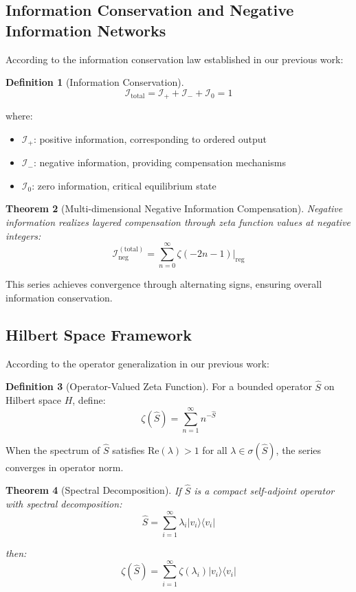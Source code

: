\documentclass[11pt]{article}
\theoremstyle{plain}
\newtheorem{theorem}{Theorem}[section]
\theoremstyle{definition}
\newtheorem{definition}[theorem]{Definition}
\theoremstyle{remark}
\begin{document}
\subsection{Information Conservation and Negative Information Networks}

According to the information conservation law established in our previous work:

\begin{definition}[Information Conservation]
$$\mathcal{I}_{\text{total}} = \mathcal{I}_+ + \mathcal{I}_- + \mathcal{I}_0 = 1$$
\end{definition}

where:
\begin{itemize}
\item $\mathcal{I}_+$: positive information, corresponding to ordered output
\item $\mathcal{I}_-$: negative information, providing compensation mechanisms
\item $\mathcal{I}_0$: zero information, critical equilibrium state
\end{itemize}

\begin{theorem}[Multi-dimensional Negative Information Compensation]
Negative information realizes layered compensation through zeta function values at negative integers:
$$\mathcal{I}_{\text{neg}}^{(\text{total})} = \sum_{n=0}^{\infty} \zeta(-2n-1) \bigg|_{\text{reg}}$$
\end{theorem}

This series achieves convergence through alternating signs, ensuring overall information conservation.

\subsection{Hilbert Space Framework}

According to the operator generalization in our previous work:

\begin{definition}[Operator-Valued Zeta Function]
For a bounded operator $\hat{S}$ on Hilbert space $H$, define:
$$\zeta(\hat{S}) = \sum_{n=1}^{\infty} n^{-\hat{S}}$$
\end{definition}

When the spectrum of $\hat{S}$ satisfies $\text{Re}(\lambda) > 1$ for all $\lambda \in \sigma(\hat{S})$, the series converges in operator norm.

\begin{theorem}[Spectral Decomposition]
If $\hat{S}$ is a compact self-adjoint operator with spectral decomposition:
$$\hat{S} = \sum_{i=1}^{\infty} \lambda_i |v_i\rangle \langle v_i|$$

then:
$$\zeta(\hat{S}) = \sum_{i=1}^{\infty} \zeta(\lambda_i) |v_i\rangle \langle v_i|$$
\end{theorem}
\end{document}
